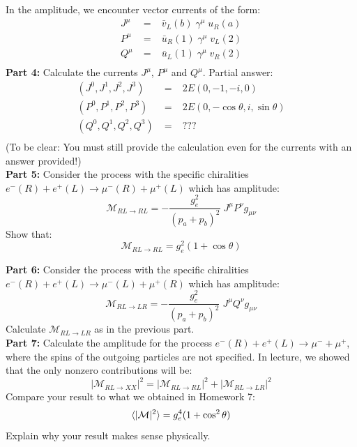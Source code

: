 \documentclass[12pt]{article}
\begin{document}
In the amplitude, we encounter vector currents of the form:
\begin{eqnarray*}
  J^\mu \; &=& \; \bar{v}_L(b) \; \gamma^\mu \; u_R(a) \\
  P^\mu \; &=& \; \bar{u}_R(1) \; \gamma^\mu \; v_L(2) \\
  Q^\mu \; &=& \; \bar{u}_L(1) \; \gamma^\mu \; v_R(2) \\
\end{eqnarray*}
\noindent
{\bf Part 4:} Calculate the currents $J^\mu$, $P^\mu$ and $Q^\mu$.  Partial answer:
\begin{eqnarray*}
  (J^0,J^1,J^2,J^3) \; &=& \; 2E(0,-1,-i,0) \\
  (P^0,P^1,P^2,P^3) \; &=& \; 2E(0,-\cos\theta,i,\sin\theta) \\
  (Q^0,Q^1,Q^2,Q^3) \; &=& \; ??? \\
\end{eqnarray*}
(To be clear:  You must still provide the calculation even for the currents with an answer provided!)\\[5pt]    

\noindent
{\bf Part 5:} Consider the process with the specific chiralities $e^-(R) + e^+(L) \to \mu^-(R) + \mu^+(L)$ which has amplitude:
$$\mathcal{M}_{RL \to RL} = -\frac{g_e^2}{(p_a+p_b)^2} \; J^\mu P^\nu g_{\mu\nu}$$
Show that:
$$\mathcal{M}_{RL \to RL} = g_e^2 (1 + \cos \theta)$$

\noindent
{\bf Part 6:} 
Consider the process with the specific chiralities $e^-(R) + e^+(L) \to \mu^-(L) + \mu^+(R)$ which has amplitude:
$$\mathcal{M}_{RL \to LR} = -\frac{g_e^2}{(p_a+p_b)^2} \; J^\mu Q^\nu g_{\mu\nu}$$
Calculate $\mathcal{M}_{RL \to LR}$ as in the previous part.\\[5pt]

\noindent
{\bf Part 7:} 
Calculate the amplitude for the process $e^-(R) + e^+(L) \to \mu^- + \mu^+$, where the spins of the outgoing particles are not specified.  In lecture, we showed that the only nonzero contributions will be:
$$|\mathcal{M}_{RL \to XX}|^2 = |\mathcal{M}_{RL \to RL}|^2 + |\mathcal{M}_{RL \to LR}|^2$$
Compare your result to what we obtained in Homework 7:
$$\braket{|\mathcal{M}|^2} = g_e^4 (1 + \cos^2 \theta)$$
Explain why your result makes sense physically.
\end{document}
